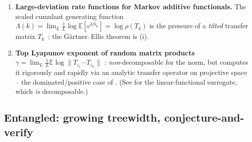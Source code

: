 \documentclass[11pt]{article}
\newcommand{\bbE}{\mathbb{E}}
\theoremstyle{plain}
\theoremstyle{definition}
\theoremstyle{remark}
\begin{document}
\begin{enumerate}[leftmargin=1.5em,itemsep=3pt]
\item \textbf{Large-deviation rate functions for Markov additive functionals.} The
scaled cumulant generating function $\Lambda(k)=\lim_L\frac1L\log\bbE[e^{kS_L}]
=\log\rho(T_k)$ is the pressure of a \emph{tilted} transfer matrix
$T_k$~\citep{dembo1998large}; the Gärtner--Ellis theorem is (i).

\item \textbf{Top Lyapunov exponent of random matrix products}
$\gamma=\lim_L\frac1L\bbE\log\|T_{i_1}\cdots T_{i_L}\|$
\citep{furstenberg1960products}: \emph{non}-decomposable for the norm, but
\citet{pollicott2010maximal} computes it rigorously and rapidly via an analytic
transfer operator on projective space -- the dominated/positive case of
. (See  for the linear-functional
surrogate, which \emph{is} decomposable.)
\end{enumerate}

\subsection{Entangled: growing treewidth, conjecture-and-verify}
\label{sec:cat-entangled}
\end{document}
